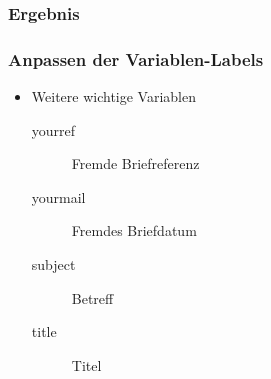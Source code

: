 \documentclass[12pt,ngerman]{beamer}
\begin{document}
\begin{frame}[plain]
\frametitle{Ergebnis}

\vspace*{-0.35cm}\begin{center}
\end{center}
\end{frame}


\begin{frame}[fragile]
\frametitle{Anpassen der Variablen-Labels}

\begin{itemize}
	\item Weitere wichtige Variablen

\begin{description}
\item[yourref] Fremde Briefreferenz 
\item[yourmail] Fremdes Briefdatum
\item[subject] Betreff
\item[title] Titel
\end{description}

\end{itemize}



\end{frame}
\end{document}
